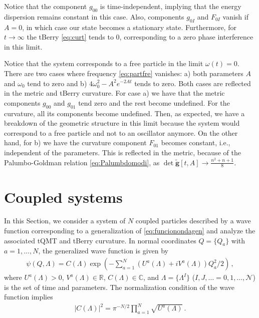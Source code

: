 \documentclass[12pt]{iopart}
\begin{document}
Notice that the component $g_{00}$ is time-independent, implying that the energy dispersion remains constant in this case. Also, components $g_{0I}$ and $F_{0I}$ vanish if $A=0$, in which case our state becomes a stationary state. Furthermore, for  $t \to \infty$ the tBerry \eqref{eq:curt} tends to $0$, corresponding to a zero phase interference in this limit.

Notice that the system corresponds to a free particle in the limit $\omega (t)=0$. There are two cases where frequency \eqref{eq:partfre} vanishes: a) both parameters $A$ and $\omega_0$ tend to zero and b)  $4\omega_0^2-A^2 e^{-2At}$ tends to zero. Both cases are reflected in the metric and tBerry curvature. 
For case a) we have that the metric components $g_{00}$ and $g_{01}$ tend zero and the rest become undefined. For the curvature, all its components become undefined. Then, as expected, we have a breakdown of the geometric structure in this limit because the system would correspond to a free particle and not to an oscillator anymore.
On the other hand, for b) we have the curvature component $F_{01}$ becomes constant, i.e., independent of the parameters. This is reflected in the metric, because of the Palumbo-Goldman relation \eqref{eq:Palumbdomodi},  as $ \det\tilde{ \boldsymbol{g}} [t, A] \to  \frac{n^2+n+1}{8}$.


\section{Coupled systems}\label{sec:coupledsystems}

In this Section, we consider a system of $N$ coupled particles described by a wave function corresponding to a generalization of \eqref{eq:funcionondagen} and analyze the associated tQMT and tBerry curvature. In normal coordinates $Q=\{ Q_a \}$ with $a=1, \dots, N$, the generalized wave function is given by
\begin{align}
\psi(Q,\Lambda)=C\left(\Lambda\right)\exp{\left(-\sum_{a=1}^N \left(U^a(\Lambda) +iV^a(\Lambda) \right) Q_a^2/2 \right)}\,,
\label{eq:funcionondagenacoplado}
\end{align}
where $U^a(\Lambda) > 0$, $V^a(\Lambda)\in \mathbb{R}$, $C(\Lambda)\in \mathbb{C}$, and $\Lambda=\{\Lambda^I\}$ ($I,J,\dots\!=0,1,\dots,\mathcal{N}$) is the set of time and parameters. The normalization condition of the wave function implies
\begin{align}
|C(\Lambda)|^2=\pi^{-N/2}\prod_{a=1}^N \sqrt{U^a(\Lambda)}\,.
\end{align}
\end{document}

